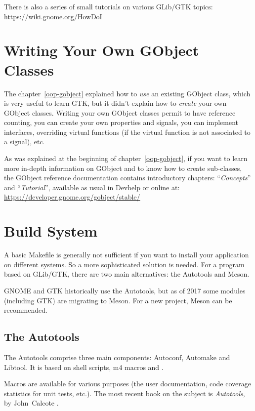 There is also a series of small tutorials on various GLib/GTK topics:\\
\url{https://wiki.gnome.org/HowDoI}

\section{Writing Your Own GObject Classes}

The chapter~\ref{oop-gobject} explained how to \emph{use} an existing GObject class, which is very useful to learn GTK, but it didn't explain how to \emph{create} your own GObject classes. Writing your own GObject classes permit to have reference counting, you can create your own properties and signals, you can implement interfaces, overriding virtual functions (if the virtual function is not associated to a signal), etc.

As was explained at the beginning of chapter~\ref{oop-gobject}, if you want to learn more in-depth information on GObject and to know how to create sub-classes, the GObject reference documentation contains introductory chapters: ``\emph{Concepts}'' and ``\emph{Tutorial}'', available as usual in Devhelp or online at:\\
\url{https://developer.gnome.org/gobject/stable/}

\section{Build System}

A basic Makefile is generally not sufficient if you want to install your application on different systems. So a more sophisticated solution is needed. For a program based on GLib/GTK, there are two main alternatives: the Autotools and Meson.

GNOME and GTK historically use the Autotools, but as of 2017 some modules (including GTK) are migrating to Meson. For a new project, Meson can be recommended.

\subsection{The Autotools}

The Autotools comprise three main components: Autoconf, Automake and Libtool. It is based on shell scripts, m4 macros and .

Macros are available for various purposes (the user documentation, code coverage statistics for unit tests, etc.). The most recent book on the subject is \emph{Autotools}, by John~Calcote \cite{autotools}.

